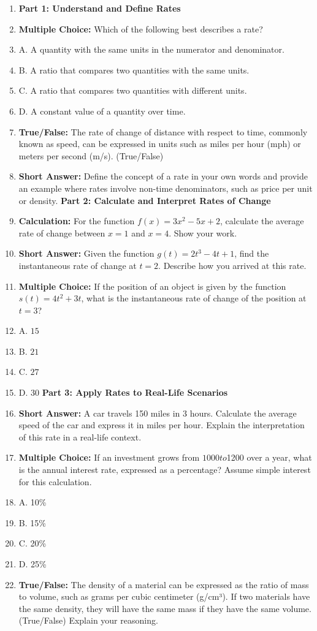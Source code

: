 \begin{enumerate}
    \item \textbf{Part 1: Understand and Define Rates}
    \item \textbf{Multiple Choice:} Which of the following best describes a rate?
    \item A. A quantity with the same units in the numerator and denominator.
    \item B. A ratio that compares two quantities with the same units.
    \item C. A ratio that compares two quantities with different units.
    \item D. A constant value of a quantity over time.
    \item \textbf{True/False:} The rate of change of distance with respect to time, commonly known as speed, can be expressed in units such as miles per hour (mph) or meters per second (m/s). (True/False)
    \item \textbf{Short Answer:} Define the concept of a rate in your own words and provide an example where rates involve non-time denominators, such as price per unit or density. \textbf{Part 2: Calculate and Interpret Rates of Change}
    \item \textbf{Calculation:} For the function $f(x) = 3x^2 - 5x + 2$, calculate the average rate of change between $x = 1$ and $x = 4$. Show your work.
    \item \textbf{Short Answer:} Given the function $g(t) = 2t^3 - 4t + 1$, find the instantaneous rate of change at $t = 2$. Describe how you arrived at this rate.
    \item \textbf{Multiple Choice:} If the position of an object is given by the function $s(t) = 4t^2 + 3t$, what is the instantaneous rate of change of the position at $t = 3$?
    \item A. $15$
    \item B. $21$
    \item C. $27$
    \item D. $30$ \textbf{Part 3: Apply Rates to Real-Life Scenarios}
    \item \textbf{Short Answer:} A car travels 150 miles in 3 hours. Calculate the average speed of the car and express it in miles per hour. Explain the interpretation of this rate in a real-life context.
    \item \textbf{Multiple Choice:} If an investment grows from $1000 to $1200 over a year, what is the annual interest rate, expressed as a percentage? Assume simple interest for this calculation.
    \item A. 10\%
    \item B. 15\%
    \item C. 20\%
    \item D. 25\%
    \item \textbf{True/False:} The density of a material can be expressed as the ratio of mass to volume, such as grams per cubic centimeter (g/cm³). If two materials have the same density, they will have the same mass if they have the same volume. (True/False) Explain your reasoning.
\end{enumerate}

